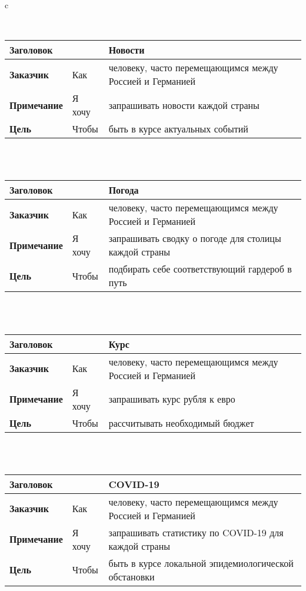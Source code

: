 \documentclass[border={3pt 0cm 3pt 0cm}]{standalone}
\begin{document}
\begin{tabular}{c}

\smallskip \\

\begin{tabular}{|l|l|l|}
	\hline
	\multicolumn{2}{|l|}{\textbf{Заголовок}} & Новости \\
		\hline
		\textbf{Заказчик} & Как & человеку, часто перемещающимся между Россией и Германией \\
	\hline
	\textbf{Примечание} & Я хочу & запрашивать новости каждой страны \\
	\hline
	\textbf{Цель} & Чтобы & быть в курсе актуальных событий \\
	\hline
\end{tabular} \\

\smallskip \\

\begin{tabular}{|l|l|l|}
	\hline
	\multicolumn{2}{|l|}{\textbf{Заголовок}} & Погода \\
	\hline
	\textbf{Заказчик} & Как & человеку, часто перемещающимся между Россией и Германией \\
	\hline
	\textbf{Примечание} & Я хочу & запрашивать сводку о погоде для столицы каждой страны \\
	\hline
	\textbf{Цель} & Чтобы & подбирать себе соответствующий гардероб в путь \\
	\hline
\end{tabular} \\

\smallskip \\

\begin{tabular}{|l|l|l|}
	\hline
	\multicolumn{2}{|l|}{\textbf{Заголовок}} & Курс \\
	\hline
	\textbf{Заказчик} & Как & человеку, часто перемещающимся между Россией и Германией \\
	\hline
	\textbf{Примечание} & Я хочу & запрашивать курс рубля к евро \\
	\hline
	\textbf{Цель} & Чтобы & рассчитывать необходимый бюджет \\
	\hline
\end{tabular} \\

\smallskip \\

\begin{tabular}{|l|l|l|}
	\hline
	\multicolumn{2}{|l|}{\textbf{Заголовок}} & COVID-19 \\
	\hline
	\textbf{Заказчик} & Как & человеку, часто перемещающимся между Россией и Германией \\
	\hline
	\textbf{Примечание} & Я хочу & запрашивать статистику по COVID-19 для каждой страны \\
	\hline
	\textbf{Цель} & Чтобы & быть в курсе локальной эпидемиологической обстановки \\
	\hline
\end{tabular} \\

\smallskip \\

\end{tabular}
\end{document}
